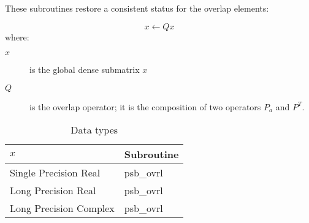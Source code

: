 These subroutines restore a consistent status for the overlap
elements:

\[ x \leftarrow Q x \]
where:
\begin{description}
\item[$x$] is the global dense submatrix $x$
\item[$Q$] is the overlap operator; it is the composition of two
operators $ P_a$ and $ P^{T}$. 
\end{description}

\begin{table}[h]
\begin{center}
\begin{tabular}{ll}
\hline
$x$ & {\bf Subroutine}\\
\hline
Single Precision Real & psb\_ovrl\\
Long Precision Real & psb\_ovrl \\
Long Precision Complex & psb\_ovrl \\
\hline
\end{tabular}
\end{center}
\caption{Data types\label{tab:f90ovrl}}
\end{table}


